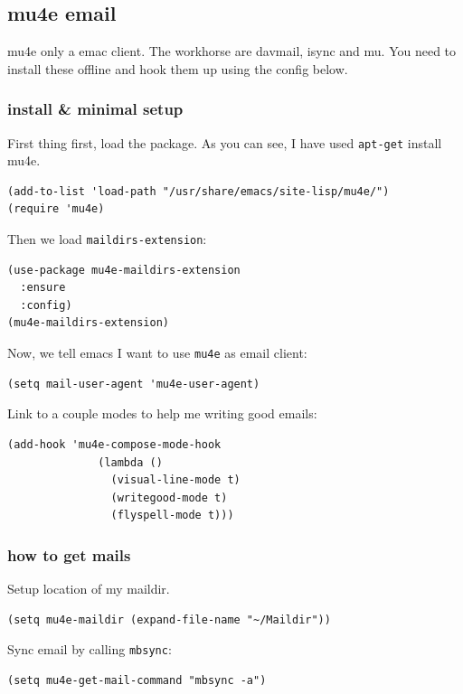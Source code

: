 \documentclass[11pt]{article}
\begin{document}
\subsection{mu4e email}
\label{sec:org83ca39d}
mu4e only a emac client. The workhorse are davmail, isync and mu. You need to install these offline and hook them up using the config below.

\subsubsection{install \& minimal setup}
\label{sec:org2b9243e}
First thing first, load the package. As you can see, I have used \texttt{apt-get} install mu4e.

\begin{verbatim}
(add-to-list 'load-path "/usr/share/emacs/site-lisp/mu4e/")
(require 'mu4e)
\end{verbatim}

Then we load \texttt{maildirs-extension}:

\begin{verbatim}
(use-package mu4e-maildirs-extension
  :ensure
  :config)
(mu4e-maildirs-extension)
\end{verbatim}

Now, we tell emacs I want to use \texttt{mu4e} as email client:

\begin{verbatim}
(setq mail-user-agent 'mu4e-user-agent)
\end{verbatim}

Link to a couple modes to help me writing good emails:
\begin{verbatim}
(add-hook 'mu4e-compose-mode-hook
              (lambda ()
                (visual-line-mode t)
                (writegood-mode t)
                (flyspell-mode t)))
\end{verbatim}
\subsubsection{how to get mails}
\label{sec:orga1660e3}
Setup location of my maildir.
\begin{verbatim}
(setq mu4e-maildir (expand-file-name "~/Maildir"))
\end{verbatim}

Sync email by calling \texttt{mbsync}:
\begin{verbatim}
(setq mu4e-get-mail-command "mbsync -a")
\end{verbatim}
\end{document}

